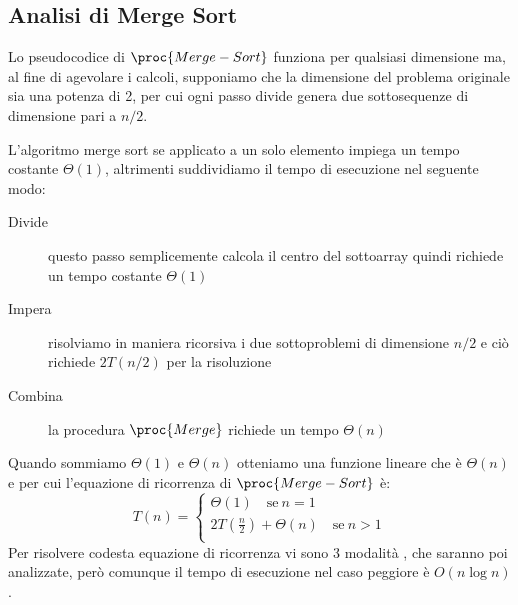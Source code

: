 \subsection{Analisi di Merge Sort}
Lo pseudocodice di $\proc{Merge-Sort}$ funziona per qualsiasi dimensione ma, al fine
di agevolare i calcoli, supponiamo che la dimensione del problema originale sia una
potenza di 2, per cui ogni passo divide genera due sottosequenze di dimensione pari a $n/2$.

L'algoritmo merge sort se applicato a un solo elemento impiega un tempo costante $\Theta(1)$,
altrimenti suddividiamo il tempo di esecuzione nel seguente modo:
\begin{description}
    \item[Divide] questo passo semplicemente calcola il centro del sottoarray quindi
                  richiede un tempo costante $\Theta(1)$
    \item[Impera] risolviamo in maniera ricorsiva i due sottoproblemi di dimensione $n/2$
                  e ciò richiede $2T(n/2)$ per la risoluzione
    \item[Combina] la procedura $\proc{Merge}$ richiede un tempo $\Theta(n)$
\end{description}
Quando sommiamo $\Theta(1)$ e $\Theta(n)$ otteniamo una funzione lineare che è $\Theta(n)$
e per cui l'equazione di ricorrenza di $\proc{Merge-Sort}$ è:
\begin{equation*}
    T(n) = \begin{cases} \Theta(1) \quad \text{se} \ n = 1 \\
                         2T(\frac{n}{2}) + \Theta(n) \quad \text{se} \ n > 1 \\
           \end{cases}
\end{equation*}
Per risolvere codesta equazione di ricorrenza vi sono 3 modalità , che saranno poi analizzate,
però comunque il tempo di esecuzione nel caso peggiore è $O(n \log n)$.
